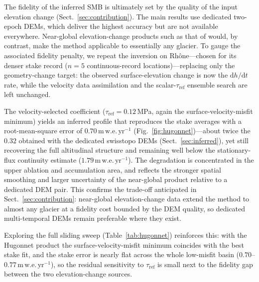 The fidelity of the inferred SMB is ultimately set by the quality of the input
elevation change (Sect.~\ref{sec:contribution}). The main results use dedicated
two-epoch DEMs, which deliver the highest accuracy but are not available everywhere.
Near-global elevation-change products such as that of \citet{hugonnet2021} would, by
contrast, make the method applicable to essentially any glacier. To gauge the
associated fidelity penalty, we repeat the inversion on
Rhône---chosen for its denser stake record ($n=5$ continuous-record
locations)---replacing only the geometry-change target: the observed
surface-elevation change is now the \citet{hugonnet2021} $\mathrm{d}h/\mathrm{d}t$
rate, while the velocity data assimilation and the scalar-$\tau_{\mathrm{ref}}$
ensemble search are left unchanged.

The velocity-selected coefficient ($\tau_{\mathrm{ref}}=0.12$\,MPa, again the
surface-velocity-misfit minimum) yields an inferred profile that reproduces the
stake averages with a root-mean-square error of $0.70\,\mathrm{m\,w.e.\,yr^{-1}}$
(Fig.~\ref{fig:hugonnet})---about twice the $0.32$ obtained with the
dedicated swisstopo DEMs (Sect.~\ref{sec:inferred}), yet still recovering the full
altitudinal structure and remaining well below the stationary-flux continuity
estimate ($1.79\,\mathrm{m\,w.e.\,yr^{-1}}$). The degradation is concentrated in the
upper ablation and accumulation area, and reflects the
stronger spatial smoothing and larger uncertainty of the near-global product
relative to a dedicated DEM pair. This confirms the trade-off anticipated in
Sect.~\ref{sec:contribution}: near-global elevation-change data extend the method to
almost any glacier at a fidelity cost bounded by the DEM quality, so dedicated
multi-temporal DEMs remain preferable where they exist. 

Exploring the full sliding sweep (Table~\ref{tab:hugonnet}) reinforces this: with the
Hugonnet product the surface-velocity-misfit minimum coincides with the best stake
fit, and the stake error is nearly flat across the whole low-misfit basin
($0.70$--$0.77\,\mathrm{m\,w.e.\,yr^{-1}}$), so the residual sensitivity to
$\tau_{\mathrm{ref}}$ is small next to the fidelity gap between the two
elevation-change sources.

